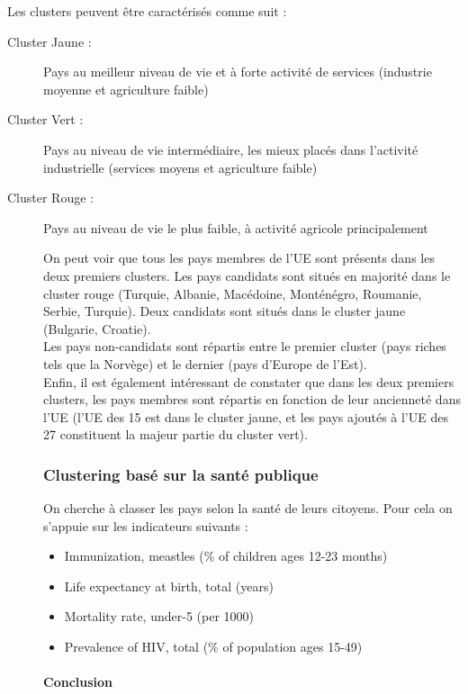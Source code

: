 Les clusters peuvent être caractérisés comme suit :
\begin{description}
\item[Cluster Jaune : ] Pays au meilleur niveau de vie et à forte activité de services (industrie moyenne et agriculture faible)
\item[Cluster Vert : ] Pays au niveau de vie intermédiaire, les mieux placés dans l'activité industrielle (services moyens et agriculture faible)
\item[Cluster Rouge :] Pays au niveau de vie le plus faible, à activité agricole principalement

\vskip 6pt

On peut voir que tous les pays membres de l'UE sont présents dans les deux
premiers clusters. Les pays candidats sont situés en majorité dans le cluster rouge
(Turquie, Albanie, Macédoine, Monténégro, Roumanie, Serbie, Turquie). Deux candidats
sont situés dans le cluster jaune (Bulgarie, Croatie).\\
Les pays non-candidats sont répartis entre le premier cluster (pays riches tels que la Norvège)
et le dernier (pays d'Europe de l'Est).\\
Enfin, il est également intéressant de constater que dans les deux premiers clusters,
les pays membres sont répartis en fonction de leur ancienneté dans l'UE (l'UE des 15
est dans le cluster jaune, et les pays ajoutés à l'UE des 27 constituent la majeur
partie du cluster vert).


\subsubsection{Clustering basé sur la santé publique}

On cherche à classer les pays selon la santé de leurs citoyens. Pour cela
on s'appuie sur les indicateurs suivants :

\begin{itemize}
\item Immunization, meastles (\% of children ages 12-23 months)
\item Life expectancy at birth, total (years)
\item Mortality rate, under-5 (per 1000)
\item Prevalence of HIV, total (\% of population ages 15-49)
\end{itemize}

\paragraph{Conclusion}\hfill\\


\end{description}
